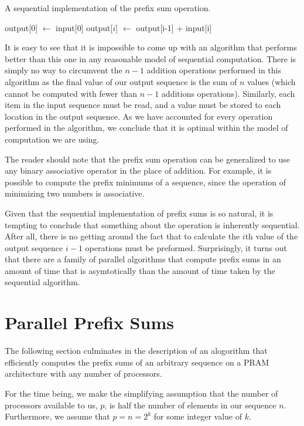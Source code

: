 \documentclass[12pt,twoside]{reedthesis}
\begin{document}
\begin{algorithm}
\caption{A sequential implementation of the prefix sum operation.}
\begin{algorithmic}
\STATE output[0] $\leftarrow$ input[0]
\STATE output[$i$] $\leftarrow$ output[i-1] + input[i] 
\ENDFOR
\end{algorithmic}
\end{algorithm}

It is easy to see that it is impossible to come up with an algorithm
that performs better than this one in any reasonable model of
sequential computation. There is simply no way to circumvent the $n-1$
addition operations performed in this algorithm as the final
value of our output sequence is the sum of $n$ values (which cannot be
computed with fewer than $n-1$ additions operations). Similarly, each
item in the input sequence must be read, and a value must be stored to
each location in the output sequence.  As we have accounted for every operation performed in the algorithm, we conclude that it is optimal within the model of computation we are using.

The reader should note that the prefix sum operation can be
generalized to use any binary associative operator in the place of
addition. For example, it is possible to compute the prefix minimums
of a sequence, since the operation of minimizing two numbers is associative.

Given that the sequential implementation of prefix sums is so natural,
it is tempting to conclude that something about the operation is
inherently sequential. After all, there is no getting around the fact
that to calculate the $i$th value of the output sequence
$i-1$ operations must be preformed. Surprisingly, it turns out that
there are a family of parallel algorithms that compute prefix sums in
an amount of time that is asymtotically than the amount of
time taken by the sequential algorithm.


\section{Parallel Prefix Sums}

The following section culminates in the description of an alogorithm
that efficiently computes the prefix sums of an arbitrary sequence on
a PRAM architecture with any number of processors.

For the time being, we make the simplifying assumption that the number of processors available to us, $p$, is half the number of elements in our sequence $n$. Furthermore, we assume that $p=n=2^k$ for some integer value of $k$.
\end{document}
